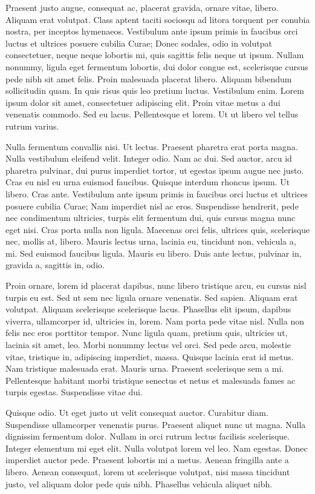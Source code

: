 \documentclass[nochapterpage,bigchapter,linedtoc,longdoc,colorback,accentcolor=tud4c]{tudreport}
\begin{document}
    Praesent justo augue, consequat ac, placerat gravida, ornare vitae, libero. Aliquam erat volutpat. Class aptent taciti sociosqu ad litora torquent per conubia nostra, per inceptos hymenaeos. Vestibulum ante ipsum primis in faucibus orci luctus et ultrices posuere cubilia Curae; Donec sodales, odio in volutpat consectetuer, neque neque lobortis mi, quis sagittis felis neque ut ipsum. Nullam nonummy, ligula eget fermentum lobortis, dui dolor congue est, scelerisque cursus pede nibh sit amet felis. Proin malesuada placerat libero. Aliquam bibendum sollicitudin quam. In quis risus quis leo pretium luctus. Vestibulum enim. Lorem ipsum dolor sit amet, consectetuer adipiscing elit. Proin vitae metus a dui venenatis commodo. Sed eu lacus. Pellentesque et lorem. Ut ut libero vel tellus rutrum varius.

    Nulla fermentum convallis nisi. Ut lectus. Praesent pharetra erat porta magna. Nulla vestibulum eleifend velit. Integer odio. Nam ac dui. Sed auctor, arcu id pharetra pulvinar, dui purus imperdiet tortor, ut egestas ipsum augue nec justo. Cras eu nisl eu urna euismod faucibus. Quisque interdum rhoncus ipsum. Ut libero. Cras ante. Vestibulum ante ipsum primis in faucibus orci luctus et ultrices posuere cubilia Curae; Nam imperdiet nisl ac eros. Suspendisse hendrerit, pede nec condimentum ultricies, turpis elit fermentum dui, quis cursus magna nunc eget nisi. Cras porta nulla non ligula. Maecenas orci felis, ultrices quis, scelerisque nec, mollis at, libero. Mauris lectus urna, lacinia eu, tincidunt non, vehicula a, mi. Sed euismod faucibus ligula. Mauris eu libero. Duis ante lectus, pulvinar in, gravida a, sagittis in, odio.

    Proin ornare, lorem id placerat dapibus, nunc libero tristique arcu, eu cursus nisl turpis eu est. Sed ut sem nec ligula ornare venenatis. Sed sapien. Aliquam erat volutpat. Aliquam scelerisque scelerisque lacus. Phasellus elit ipsum, dapibus viverra, ullamcorper id, ultricies in, lorem. Nam porta pede vitae nisl. Nulla non felis nec eros porttitor tempor. Nunc ligula quam, pretium quis, ultricies ut, lacinia sit amet, leo. Morbi nonummy lectus vel orci. Sed pede arcu, molestie vitae, tristique in, adipiscing imperdiet, massa. Quisque lacinia erat id metus. Nam tristique malesuada erat. Mauris urna. Praesent scelerisque sem a mi. Pellentesque habitant morbi tristique senectus et netus et malesuada fames ac turpis egestas. Suspendisse vitae dui.

    Quisque odio. Ut eget justo ut velit consequat auctor. Curabitur diam. Suspendisse ullamcorper venenatis purus. Praesent aliquet nunc ut magna. Nulla dignissim fermentum dolor. Nullam in orci rutrum lectus facilisis scelerisque. Integer elementum mi eget elit. Nulla volutpat lorem vel leo. Nam egestas. Donec imperdiet auctor pede. Praesent lobortis mi a metus. Aenean fringilla ante a libero. Aenean consequat, lorem ut scelerisque volutpat, nisi massa tincidunt justo, vel aliquam dolor pede quis nibh. Phasellus vehicula aliquet nibh.
\end{document}
